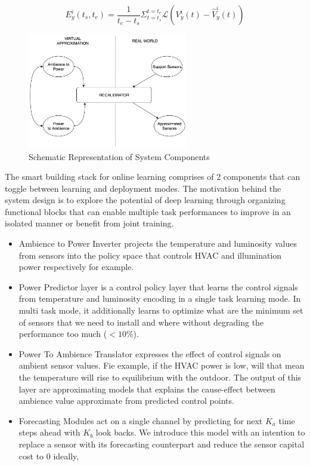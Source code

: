 \begin{equation}
E^i_y(t_s, t_e ) = \frac{1}{t_e-t_s}\Sigma_{ t = t_s}^{t = t_e } \mathcal{L} ( V^i_y(t) - \hat{V}^i_y (t) )
\label{eq:powerDeviation}
\end{equation}

\begin{figure}
    \centering
    \includegraphics[width= 7cm]{img/schematicBlock.png}
    \caption{Schematic Representation of System Components}
    \label{fig:schematicBlock}
\end{figure}




The  smart building stack for online learning comprises of 2 components that can toggle between learning and deployment modes. 
The motivation behind the system design is to explore the potential of deep learning through organizing functional blocks that can enable multiple task performances to improve in an isolated manner or benefit from joint training.

\begin{itemize}
\item Ambience to Power Inverter projects the temperature and  luminosity values from sensors into the policy space that controls HVAC and illumination power respectively for example.
\item Power Predictor layer is a control policy layer that learns the control signals from temperature and luminosity encoding in a single task learning mode. In multi task mode, it additionally learns to optimize what are the minimum set of sensors that we need to install and where without degrading the performance too much ($ < 10\%$). 
 
\item Power To Ambience Translator expresses the effect of control signals on ambient sensor values. Fie example, if the HVAC power is low, will that mean the temperature will rise to equilibrium with the outdoor.  The output of this layer are approximating models that explains the cause-effect between ambience value approximate from predicted control points. 
\item Forecasting Modules act on a single channel by predicting for next $K_a$ time steps ahead with $K_b$ look backs. We introduce this model with an intention to replace a sensor with its forecasting counterpart and reduce the sensor capital cost to 0 ideally, 
\end{itemize}



